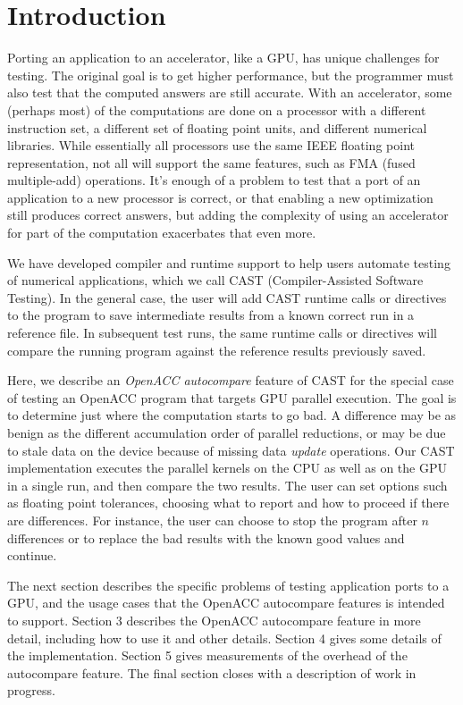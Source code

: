 \section{Introduction}

Porting an application to an accelerator, like a GPU, has unique challenges for testing.
The original goal is to get higher performance, but the programmer must also test that the computed answers are still accurate.
With an accelerator, some (perhaps most) of the computations are done on a processor with a different instruction set, a different set of floating point units, and different numerical libraries.
While essentially all processors use the same IEEE floating point representation, not all will support the same features, such as FMA (fused multiple-add) operations.
It's enough of a problem to test that a port of an application to a new processor is correct, or that enabling a new optimization still produces correct answers, but adding the complexity of using an accelerator for part of the computation exacerbates that even more.

We have developed compiler and runtime support to help users automate testing of numerical applications, which we call CAST (Compiler-Assisted Software Testing).
In the general case, the user will add CAST runtime calls or directives to the program to save intermediate results from a known correct run in a reference file.
In subsequent test runs, the same runtime calls or directives will compare the running program against the reference results previously saved.

Here, we describe an \emph{OpenACC autocompare} feature of CAST for the special case of testing an OpenACC program that targets GPU parallel execution.
The goal is to determine just where the computation starts to go bad.
A difference may be as benign as the different accumulation order of parallel reductions, or may be due to stale data on the device because of missing data \emph{update} operations.
Our CAST implementation executes the parallel kernels on the CPU as well as on the GPU in a single run, and then compare the two results.
The user can set options such as floating point tolerances, choosing what to report and how to proceed if there are differences.
For instance, the user can choose to stop the program after $n$ differences or to replace the bad results with the known good values and continue.

The next section describes the specific problems of testing application ports to a GPU, and the usage cases that the OpenACC autocompare features is intended to support.
Section 3 describes the OpenACC autocompare feature in more detail, including how to use it and other details.
Section 4 gives some details of the implementation.
Section 5 gives measurements of the overhead of the autocompare feature.
The final section closes with a description of work in progress.


